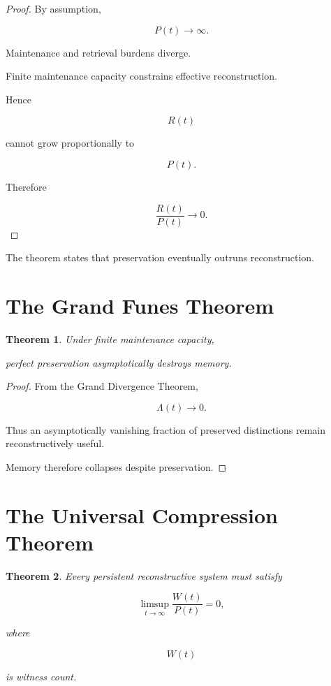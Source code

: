 \documentclass[12pt,oneside]{book}
\theoremstyle{plain} \newtheorem{theorem}{Theorem}[chapter] \newtheorem{lemma}[theorem]{Lemma} \newtheorem{proposition}[theorem]{Proposition} \newtheorem{corollary}[theorem]{Corollary}
\theoremstyle{definition} \newtheorem{definition}[theorem]{Definition} \newtheorem{axiom}[theorem]{Axiom} \newtheorem{construction}[theorem]{Construction}
\theoremstyle{remark} \newtheorem{remark}[theorem]{Remark} \newtheorem{example}[theorem]{Example}
\begin{document}
\begin{proof}

By assumption,

\[
P(t)
\rightarrow
\infty.
\]

Maintenance and retrieval burdens diverge.

Finite maintenance capacity constrains effective reconstruction.

Hence

\[
R(t)
\]

cannot grow proportionally to

\[
P(t).
\]

Therefore

\[
\frac{R(t)}
{P(t)}
\rightarrow
0.
\]

\end{proof}

The theorem states that preservation eventually outruns reconstruction.

\section{The Grand Funes Theorem}

\begin{theorem}

Under finite maintenance capacity,

perfect preservation asymptotically destroys memory.

\end{theorem}

\begin{proof}

From the Grand Divergence Theorem,

\[
\Lambda(t)
\rightarrow
0.
\]

Thus an asymptotically vanishing fraction of preserved distinctions remain reconstructively useful.

Memory therefore collapses despite preservation.

\end{proof}

\section{The Universal Compression Theorem}

\begin{theorem}

Every persistent reconstructive system must satisfy

\[
\limsup_{t\to\infty}
\frac{W(t)}
{P(t)}
=
0,
\]

where

\[
W(t)
\]

is witness count.

\end{theorem}
\end{document}
